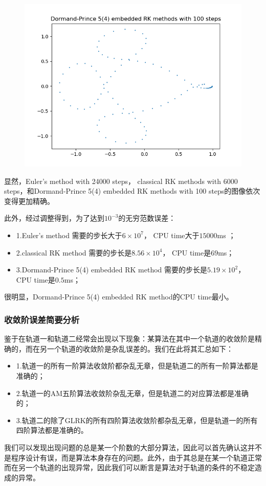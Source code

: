 \documentclass{ctexart}
\begin{document}
\begin{sloppypar}
\begin{figure}[H]
\end{figure}
\begin{figure}[H]
\centering
\includegraphics[scale = 0.45]{./report_src/Figure_39.png}
\end{figure}

显然，Euler's method with 24000 steps， classical RK methods with 6000 steps，和Dormand-Prince 5(4) embedded RK methods with 100 steps的图像依次变得更加精确。

此外，经过调整得到，为了达到$10^{-3}$的无穷范数误差：
\begin{itemize}
    \item 1.Euler's method 需要的步长大于$6 \times 10^7$， CPU time大于$15000$ms ；
    \item 2.classical RK method 需要的步长是$8.56 \times 10^4$， CPU time是$69$ms；
    \item 3.Dormand-Prince 5(4) embedded RK method 需要的步长是$5.19 \times 10^2$， CPU time是$0.5$ms；
\end{itemize}
很明显，Dormand-Prince 5(4) embedded RK method的CPU time最小。

\subsubsection{收敛阶误差简要分析}
鉴于在轨道一和轨道二经常会出现以下现象：某算法在其中一个轨道的收敛阶是精确的，而在另一个轨道的收敛阶是杂乱误差的。我们在此将其汇总如下：
\begin{itemize}
    \item 1.轨道一的所有一阶算法收敛阶都杂乱无章，但是轨道二的所有一阶算法都是准确的；
    \item 2.轨道一的AM五阶算法收敛阶杂乱无章，但是轨道二的对应算法都是准确的；
    \item 3.轨道二的除了GLRK的所有四阶算法收敛阶都杂乱无章，但是轨道一的所有四阶算法都是准确的。
\end{itemize}
我们可以发现出现问题的总是某一个阶数的大部分算法，因此可以首先确认这并不是程序设计有误，而是算法本身存在的问题。此外，由于其总是在某一个轨道正常而在另一个轨道的出现异常，因此我们可以断言是算法对于轨道的条件的不稳定造成的异常。


\end{sloppypar}
\end{document}
